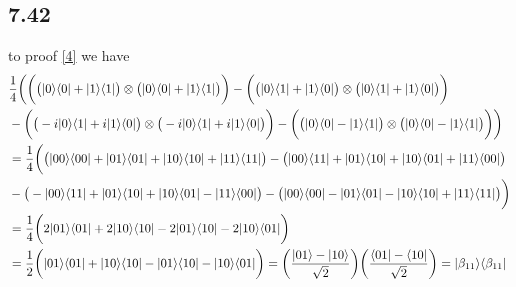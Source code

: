\documentclass{article}
\newcommand{\op}[2]{|#1\rangle \langle#2|}
\newcommand{\tensor}[2]{#1 \otimes #2}
\begin{document}
\subsection*{7.42}
to proof \ref{4} we have
\begin{align*}
   &\frac{1}{4}\bigg(\bigg(\tensor{\big(\op{0}{0}+\op{1}{1}\big)}{\big(\op{0}{0}+\op{1}{1}\big)}\bigg)-\bigg(\tensor{\big(\op{0}{1}+\op{1}{0}\big)}{\big(\op{0}{1}+\op{1}{0}\big)}\bigg)\\&
   -\bigg(\tensor{\big(-i\op{0}{1}+i\op{1}{0}\big)}{\big(-i\op{0}{1}+i\op{1}{0}\big)}\bigg)-\bigg(\tensor{\big(\op{0}{0}-\op{1}{1}\big)}{\big(\op{0}{0}-\op{1}{1}\big)}\bigg)\bigg) \\
   &= \frac{1}{4}\bigg(\big(\op{00}{00}+\op{01}{01}+\op{10}{10}+\op{11}{11}\big)-\big(\op{00}{11}+\op{01}{10}+\op{10}{01}+\op{11}{00}\big)\\
   &-\big(-\op{00}{11}+\op{01}{10}+\op{10}{01}-\op{11}{00}\big)-\big(\op{00}{00}-\op{01}{01}-\op{10}{10}+\op{11}{11}\big)\bigg)\\
   &=\frac{1}{4}\bigg(2\op{01}{01}+2\op{10}{10}-2\op{01}{10}-2\op{10}{01}\bigg)\\
   &=\frac{1}{2}\bigg(\op{01}{01}+\op{10}{10}-\op{01}{10}-\op{10}{01}\bigg) = \bigg(\frac{\ket{01}-\ket{10}}{\sqrt{2}}\bigg)\bigg(\frac{\bra{01}-\bra{10}}{\sqrt{2}}\bigg) = \op{\beta_{11}}{\beta_{11}}
\end{align*}
\end{document}
